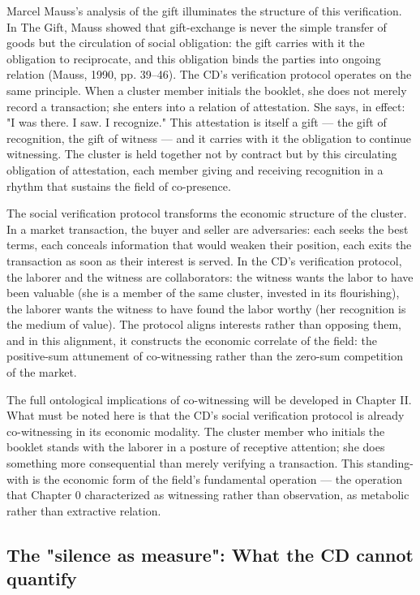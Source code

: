 Marcel Mauss's analysis of the gift illuminates the structure of this verification. In The Gift, Mauss showed that gift-exchange is never the simple transfer of goods but the circulation of social obligation: the gift carries with it the obligation to reciprocate, and this obligation binds the parties into ongoing relation (Mauss, 1990, pp. 39–46). The CD's verification protocol operates on the same principle. When a cluster member initials the booklet, she does not merely record a transaction; she enters into a relation of attestation. She says, in effect: "I was there. I saw. I recognize." This attestation is itself a gift — the gift of recognition, the gift of witness — and it carries with it the obligation to continue witnessing. The cluster is held together not by contract but by this circulating obligation of attestation, each member giving and receiving recognition in a rhythm that sustains the field of co-presence.

The social verification protocol transforms the economic structure of the cluster. In a market transaction, the buyer and seller are adversaries: each seeks the best terms, each conceals information that would weaken their position, each exits the transaction as soon as their interest is served. In the CD's verification protocol, the laborer and the witness are collaborators: the witness wants the labor to have been valuable (she is a member of the same cluster, invested in its flourishing), the laborer wants the witness to have found the labor worthy (her recognition is the medium of value). The protocol aligns interests rather than opposing them, and in this alignment, it constructs the economic correlate of the field: the positive-sum attunement of co-witnessing rather than the zero-sum competition of the market.

The full ontological implications of co-witnessing will be developed in Chapter II. What must be noted here is that the CD's social verification protocol is already co-witnessing in its economic modality. The cluster member who initials the booklet stands with the laborer in a posture of receptive attention; she does something more consequential than merely verifying a transaction. This standing-with is the economic form of the field's fundamental operation — the operation that Chapter 0 characterized as witnessing rather than observation, as metabolic rather than extractive relation.

\subsection{The "silence as measure": What the CD cannot quantify}

